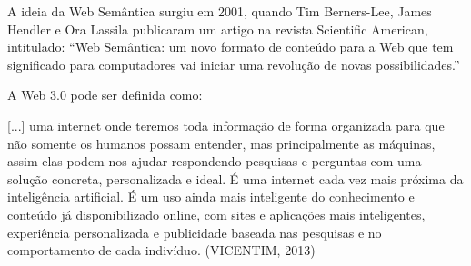 A ideia da Web Semântica surgiu em 2001, quando Tim Berners-Lee, James Hendler e
Ora Lassila publicaram um artigo na revista Scientific American, intitulado: “Web
Semântica: um novo formato de conteúdo para a Web que tem significado para
computadores vai iniciar uma revolução de novas possibilidades.”

A Web 3.0 pode ser definida como:

[...] uma internet onde teremos toda informação de forma organizada para que não
somente os humanos possam entender, mas principalmente as máquinas, assim elas
podem nos ajudar respondendo pesquisas e perguntas com uma solução concreta,
personalizada e ideal. É uma internet cada vez mais próxima da inteligência
artificial. É um uso ainda mais inteligente do conhecimento e conteúdo já
disponibilizado online, com sites e aplicações mais inteligentes, experiência
personalizada e publicidade baseada nas pesquisas e no comportamento de cada
indivíduo. (VICENTIM, 2013)